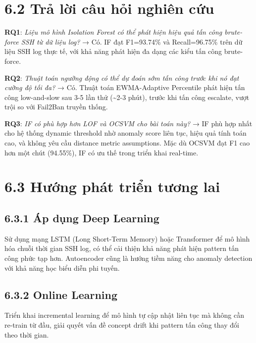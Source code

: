 \documentclass[
  a4paper]{report}
\begin{document}
\section{6.2 Trả lời câu hỏi nghiên
cứu}\label{trux1ea3-lux1eddi-cuxe2u-hux1ecfi-nghiuxean-cux1ee9u}

\textbf{RQ1}: \emph{Liệu mô hình Isolation Forest có thể phát hiện hiệu
quả tấn công brute-force SSH từ dữ liệu log?} → Có. IF đạt F1=93.74\% và
Recall=96.75\% trên dữ liệu SSH log thực tế, với khả năng phát hiện đa
dạng các kiểu tấn công brute-force.

\textbf{RQ2}: \emph{Thuật toán ngưỡng động có thể dự đoán sớm tấn công
trước khi nó đạt cường độ tối đa?} → Có. Thuật toán EWMA-Adaptive
Percentile phát hiện tấn công low-and-slow sau 3-5 lần thử
(\textasciitilde2-3 phút), trước khi tấn công escalate, vượt trội so với
Fail2Ban truyền thống.

\textbf{RQ3}: \emph{IF có phù hợp hơn LOF và OCSVM cho bài toán này?} →
IF phù hợp nhất cho hệ thống dynamic threshold nhờ anomaly score liên
tục, hiệu quả tính toán cao, và không yêu cầu distance metric
assumptions. Mặc dù OCSVM đạt F1 cao hơn một chút (94.55\%), IF có ưu
thế trong triển khai real-time.

\section{6.3 Hướng phát triển tương
lai}\label{hux1b0ux1edbng-phuxe1t-triux1ec3n-tux1b0ux1a1ng-lai}

\subsection{6.3.1 Áp dụng Deep
Learning}\label{uxe1p-dux1ee5ng-deep-learning}

Sử dụng mạng LSTM (Long Short-Term Memory) hoặc Transformer để mô hình
hóa chuỗi thời gian SSH log, có thể cải thiện khả năng phát hiện pattern
tấn công phức tạp hơn. Autoencoder cũng là hướng tiềm năng cho anomaly
detection với khả năng học biểu diễn phi tuyến.

\subsection{6.3.2 Online Learning}\label{online-learning}

Triển khai incremental learning để mô hình tự cập nhật liên tục mà không
cần re-train từ đầu, giải quyết vấn đề concept drift khi pattern tấn
công thay đổi theo thời gian.
\end{document}
